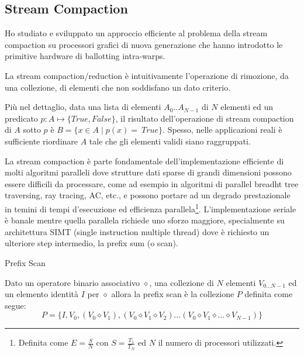 \subsection{Stream Compaction}
Ho studiato e sviluppato  un approccio efficiente al problema della stream compaction su processori
grafici di nuova generazione che hanno introdotto le primitive hardware di
ballotting intra-warps.

La stream compaction/reduction è intuitivamente l'operazione di
rimozione, da una collezione, di elementi che non soddisfano un dato
criterio.

Più nel dettaglio, data una lista di elementi  $A_0..A_{N-1}$ di $N$ elementi
ed un predicato $p:A \mapsto \{True,False\}$, il risultato dell'operazione di
stream compaction di $A$ sotto $p$ è $B=\{x \in A \;|\; p(x)=\ True\}$. 
Spesso, nelle applicazioni reali è sufficiente riordinare $A$ tale che gli
elementi validi siano raggruppati. 

La stream compaction è parte fondamentale dell'implementazione
efficiente di molti algoritmi paralleli dove strutture dati sparse di grandi
dimensioni possono essere  difficili da processare, come ad esempio  in
algoritmi di parallel breadht tree traversing, ray tracing, AC, etc.,
e possono portare ad un degrado prestazionale in temini di tempi
d'esecuzione ed efficienza parallela\footnote{Definita come $E=\frac{S}{N}
	$ con $S=\frac{T_1}{T_N}$ ed $N$ il numero di processori utilizzati.}.
L'implementazione seriale è banale mentre quella parallela richiede uno sforzo maggiore, specialmente su
architettura SIMT (single instruction multiple thread) dove è richiesto un
ulteriore step intermedio, la prefix sum (o scan). 
\begin{mydef}{Prefix Scan}
	
	Dato un operatore binario associativo  $\diamond$, una collezione di $N$
	elementi $V_{0 \ldots {N-1}}$ ed un elemento identità $I$ per $\diamond$
	allora la prefix scan è la collezione $P$ definita come segue:
	\[
	P= \{I,V_0,(V_0 \diamond V_1),(V_0 \diamond V_1 \diamond V_2) \ldots
	(V_0 \diamond V_1 \diamond \ldots \diamond V_{N-1}) \}
	\]
	
\end{mydef}

